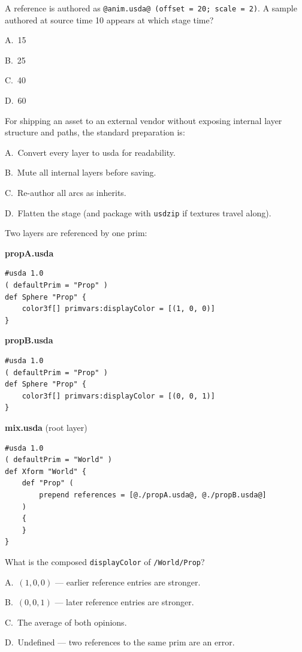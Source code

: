 A reference is authored as
\texttt{@anim.usda@ (offset = 20; scale = 2)}. A sample authored at source
time 10 appears at which stage time?
\begin{Choices}
  \item A.\ 15
  \item B.\ 25
  \item C.\ 40
  \item D.\ 60
\end{Choices}

For shipping an asset to an external vendor without exposing internal layer
structure and paths, the standard preparation is:
\begin{Choices}
  \item A.\ Convert every layer to usda for readability.
  \item B.\ Mute all internal layers before saving.
  \item C.\ Re-author all arcs as inherits.
  \item D.\ Flatten the stage (and package with \texttt{usdzip} if textures travel along).
\end{Choices}

Two layers are referenced by one prim:

\noindent\textbf{propA.usda}
\begin{lstlisting}
#usda 1.0
( defaultPrim = "Prop" )
def Sphere "Prop" {
    color3f[] primvars:displayColor = [(1, 0, 0)]
}
\end{lstlisting}

\noindent\textbf{propB.usda}
\begin{lstlisting}
#usda 1.0
( defaultPrim = "Prop" )
def Sphere "Prop" {
    color3f[] primvars:displayColor = [(0, 0, 1)]
}
\end{lstlisting}

\noindent\textbf{mix.usda} (root layer)
\begin{lstlisting}
#usda 1.0
( defaultPrim = "World" )
def Xform "World" {
    def "Prop" (
        prepend references = [@./propA.usda@, @./propB.usda@]
    )
    {
    }
}
\end{lstlisting}

What is the composed \texttt{displayColor} of \texttt{/World/Prop}?
\begin{Choices}
  \item A.\ $(1, 0, 0)$ --- earlier reference entries are stronger.
  \item B.\ $(0, 0, 1)$ --- later reference entries are stronger.
  \item C.\ The average of both opinions.
  \item D.\ Undefined --- two references to the same prim are an error.
\end{Choices}

